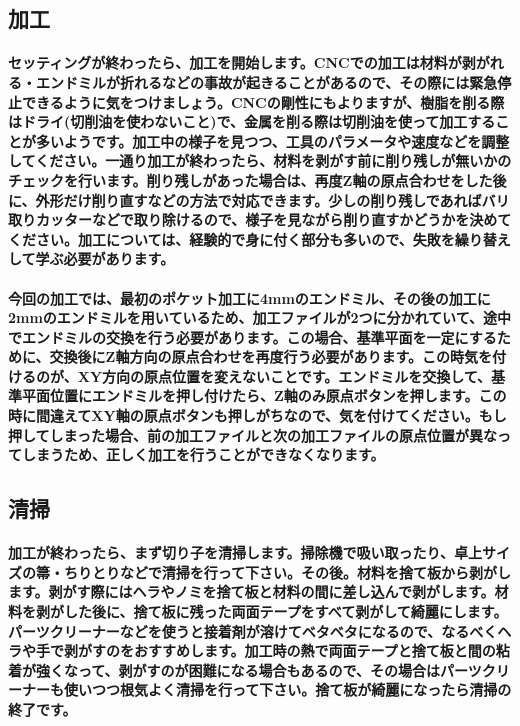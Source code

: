 \documentclass[b5paper, 9pt, twocolumn, titlepage,openany]{jsbook}%
\begin{document}

\subsection{加工}
\paragraph{セッティングが終わったら、加工を開始します。CNCでの加工は材料が剥がれる・エンドミルが折れるなどの事故が起きることがあるので、その際には緊急停止できるように気をつけましょう。CNCの剛性にもよりますが、樹脂を削る際はドライ(切削油を使わないこと)で、金属を削る際は切削油を使って加工することが多いようです。加工中の様子を見つつ、工具のパラメータや速度などを調整してください。一通り加工が終わったら、材料を剥がす前に削り残しが無いかのチェックを行います。削り残しがあった場合は、再度Z軸の原点合わせをした後に、外形だけ削り直すなどの方法で対応できます。少しの削り残しであればバリ取りカッターなどで取り除けるので、様子を見ながら削り直すかどうかを決めてください。加工については、経験的で身に付く部分も多いので、失敗を繰り替えして学ぶ必要があります。}


\paragraph{今回の加工では、最初のポケット加工に4mmのエンドミル、その後の加工に2mmのエンドミルを用いているため、加工ファイルが2つに分かれていて、途中でエンドミルの交換を行う必要があります。この場合、基準平面を一定にするために、交換後にZ軸方向の原点合わせを再度行う必要があります。この時気を付けるのが、XY方向の原点位置を変えないことです。エンドミルを交換して、基準平面位置にエンドミルを押し付けたら、Z軸のみ原点ボタンを押します。この時に間違えてXY軸の原点ボタンも押しがちなので、気を付けてください。もし押してしまった場合、前の加工ファイルと次の加工ファイルの原点位置が異なってしまうため、正しく加工を行うことができなくなります。}


\subsection{清掃}
\paragraph{加工が終わったら、まず切り子を清掃します。掃除機で吸い取ったり、卓上サイズの箒・ちりとりなどで清掃を行って下さい。その後。材料を捨て板から剥がします。剥がす際にはヘラやノミを捨て板と材料の間に差し込んで剥がします。材料を剥がした後に、捨て板に残った両面テープをすべて剥がして綺麗にします。パーツクリーナーなどを使うと接着剤が溶けてベタベタになるので、なるべくヘラや手で剥がすのをおすすめします。加工時の熱で両面テープと捨て板と間の粘着が強くなって、剥がすのが困難になる場合もあるので、その場合はパーツクリーナーも使いつつ根気よく清掃を行って下さい。捨て板が綺麗になったら清掃の終了です。}
\end{document}
